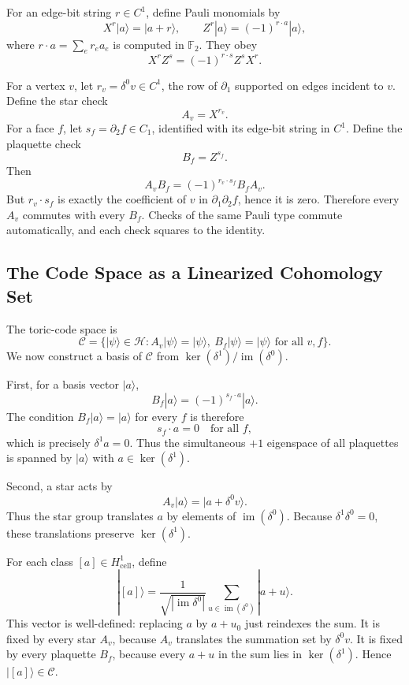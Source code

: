 For an edge-bit string \(r\in C^1\), define Pauli monomials by
\[
  X^r|a\rangle=|a+r\rangle,\qquad
  Z^r|a\rangle=(-1)^{r\cdot a}|a\rangle ,
\]
where \(r\cdot a=\sum_e r_ea_e\) is computed in \(\mathbb{F}_2\).
They obey
\[
  X^rZ^s=(-1)^{r\cdot s}Z^sX^r .
\]

For a vertex \(v\), let \(r_v=\delta^0 v\in C^1\), the row of
\(\partial_1\) supported on edges incident to \(v\). Define the star check
\[
  A_v=X^{r_v}.
\]
For a face \(f\), let \(s_f=\partial_2 f\in C_1\), identified with its edge-bit
string in \(C^1\). Define the plaquette check
\[
  B_f=Z^{s_f}.
\]
Then
\[
  A_vB_f=(-1)^{r_v\cdot s_f}B_fA_v.
\]
But \(r_v\cdot s_f\) is exactly the coefficient of \(v\) in
\(\partial_1\partial_2f\), hence it is zero. Therefore every \(A_v\) commutes
with every \(B_f\). Checks of the same Pauli type commute automatically, and
each check squares to the identity.

\subsection{The Code Space as a Linearized Cohomology Set}

The toric-code space is
\[
  \mathcal C=\{|\psi\rangle\in\mathcal H:
  A_v|\psi\rangle=|\psi\rangle,\ B_f|\psi\rangle=|\psi\rangle
  \text{ for all }v,f\}.
\]
We now construct a basis of \(\mathcal C\) from
\(\ker(\delta^1)/\operatorname{im}(\delta^0)\).

First, for a basis vector \(|a\rangle\),
\[
  B_f|a\rangle=(-1)^{s_f\cdot a}|a\rangle .
\]
The condition \(B_f|a\rangle=|a\rangle\) for every \(f\) is therefore
\[
  s_f\cdot a=0\quad\text{for all }f,
\]
which is precisely \(\delta^1a=0\). Thus the simultaneous \(+1\) eigenspace of
all plaquettes is spanned by \(|a\rangle\) with \(a\in\ker(\delta^1)\).

Second, a star acts by
\[
  A_v|a\rangle=|a+\delta^0 v\rangle.
\]
Thus the star group translates \(a\) by elements of
\(\operatorname{im}(\delta^0)\). Because \(\delta^1\delta^0=0\), these
translations preserve \(\ker(\delta^1)\).

For each class \([a]\in H^1_{\mathrm{cell}}\), define
\[
  |[a]\rangle
  =
  \frac{1}{\sqrt{|\operatorname{im}\delta^0|}}
  \sum_{u\in\operatorname{im}(\delta^0)} |a+u\rangle .
\]
This vector is well-defined: replacing \(a\) by \(a+u_0\) just reindexes the
sum. It is fixed by every star \(A_v\), because \(A_v\) translates the summation
set by \(\delta^0v\). It is fixed by every plaquette \(B_f\), because every
\(a+u\) in the sum lies in \(\ker(\delta^1)\). Hence \(|[a]\rangle\in\mathcal C\).

